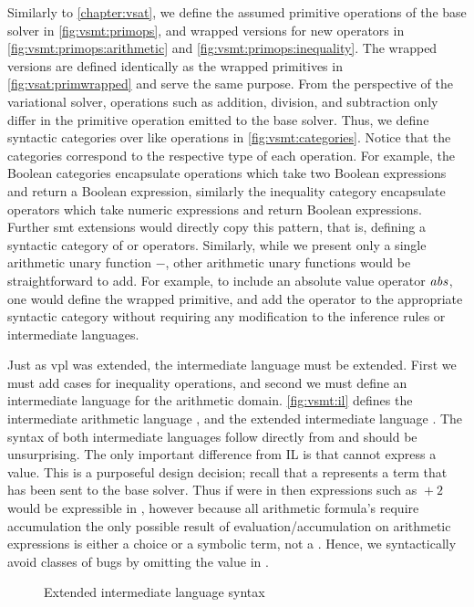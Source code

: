 Similarly to \autoref{chapter:vsat}, we define the assumed primitive operations
of the base solver in \autoref{fig:vsmt:primops}, and wrapped versions for new
operators in \autoref{fig:vsmt:primops:arithmetic} and
\autoref{fig:vsmt:primops:inequality}. The wrapped versions are defined
identically as the wrapped primitives in \autoref{fig:vsat:primwrapped} and
serve the same purpose.
%
From the perspective of the variational solver, operations such as addition,
division, and subtraction only differ in the primitive operation emitted to the
base solver. Thus, we define syntactic categories over like operations in
\autoref{fig:vsmt:categories}. Notice that the categories correspond to the
respective type of each operation. For example, the Boolean categories
encapsulate operations which take two Boolean expressions and return a Boolean
expression, similarly the inequality category encapsulate operators which take
numeric expressions and return Boolean expressions. Further \ac{smt} extensions
would directly copy this pattern, that is, defining a syntactic category of
 or  operators. Similarly, while we present
only a single arithmetic unary function $-$, other arithmetic unary functions
would be straightforward to add. For example, to include an absolute value
operator $\mathit{abs}$, one would define the wrapped primitive, and add the
operator to the appropriate syntactic category without requiring any
modification to the inference rules or intermediate languages.

Just as \ac{vpl} was extended, the intermediate language must be extended. First
we must add cases for inequality operations, and second we must define an
intermediate language for the arithmetic domain.
%
\autoref{fig:vsmt:il} defines the intermediate arithmetic language \eAR, and the
extended intermediate language \eIL. The syntax of both intermediate languages
follow directly from \evpl{} and should be unsurprising. The only important
difference from IL is that \eAR{} cannot express a \unit{} value. This is a
purposeful design decision; recall that a \unit{} represents a term that has
been sent to the base solver. Thus if \unit{} were in \eAR{} then expressions
such as $\unit{} + 2$ would be expressible in \eAR{}, however because all
arithmetic formula's require accumulation the only possible result of
evaluation/accumulation on arithmetic expressions is either a choice or a
symbolic term, not a \unit{}. Hence, we syntactically avoid classes of bugs by
omitting the \unit{} value in \eAR{}.
%
\begin{figure}
  
  \caption{Extended intermediate language syntax}%
  \label{fig:vsmt:il}
\end{figure}

